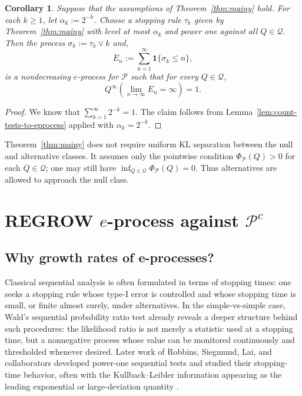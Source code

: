 \documentclass[11pt]{article}
\newcommand{\Pcal}{\mathcal{P}}
\newcommand{\Qcal}{\mathcal{Q}}
\newcommand{\one}{\mathbf{1}}
\newtheorem{corollary}[theorem]{Corollary}
\theoremstyle{definition}
\theoremstyle{definition}
\begin{document}
\begin{corollary}\label{cor:main-implies-eproc}
Suppose that the assumptions of Theorem~\ref{thm:mainy} hold.  For each $k\ge1$, let $\alpha_k:=2^{-k}$. Choose a stopping rule $\tau_k$ given by Theorem~\ref{thm:mainy} with level at most $\alpha_k$ and power one against all $Q\in\Qcal$. Then the process $\sigma_k:=\tau_k\vee k$ and,
\[
E_n:=\sum_{k=1}^{\infty}\one\{\sigma_k\le n\},
\]
is a nondecreasing $e$-process for $\Pcal$ such that for every $Q\in\Qcal$,
\[
Q^{\infty}\left(\lim_{n\to\infty} E_n=\infty\right)=1.
\]
\end{corollary}

\begin{proof}
We know that $\sum_{k=1}^{\infty} 2^{-k}=1$. The claim follows from Lemma~\ref{lem:count-tests-to-eprocess} applied with $\alpha_k=2^{-k}$.    
\end{proof}

\noindent Theorem~\ref{thm:mainy} does not require uniform KL separation between the null and alternative classes.  It assumes only the pointwise condition $\Phi_\Pcal(Q)>0$ for each $Q\in\Qcal$; one may still have $\inf_{Q\in\Qcal}\Phi_\Pcal(Q)=0$.  Thus alternatives are allowed to approach the null class.




\section{REGROW \texorpdfstring{$e$}{e}-process against \texorpdfstring{$\Pcal^c$}{P-complement}}\label{sec:regrow}


\subsection{Why growth rates of e-processes?}

Classical sequential analysis is often formulated in terms of stopping times: one seeks a
stopping rule whose type-I error is controlled and whose stopping time is small, or finite
almost surely, under alternatives.  In the simple-vs-simple case, Wald's sequential
probability ratio test already reveals a deeper structure behind such procedures: the
likelihood ratio is not merely a statistic used at a stopping time, but a nonnegative
process whose value can be monitored continuously and thresholded whenever desired.  Later work of Robbins, Siegmund, Lai, and collaborators
developed power-one sequential tests and studied their stopping-time behavior, often
with the Kullback--Leibler information appearing as the leading exponential or
large-deviation quantity \parencite{darlingrobbins1968,robbins_siegmund_1974,lai1977,farrell1964}.
\end{document}
